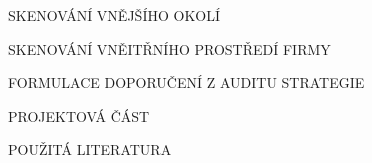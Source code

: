 \begin{lefttextpipe}
	{\Large \MakeUppercase{} SKENOVÁNÍ VNĚJŠÍHO OKOLÍ}
\end{lefttextpipe}

\begin{lefttextpipe}
	{\Large \MakeUppercase{} SKENOVÁNÍ VNĚITŘNÍHO PROSTŘEDÍ FIRMY}
\end{lefttextpipe}

\begin{lefttextpipe}
	{\Large \MakeUppercase{} FORMULACE DOPORUČENÍ Z AUDITU STRATEGIE}
\end{lefttextpipe}

\begin{lefttextpipe}
	{\Large \MakeUppercase{} PROJEKTOVÁ ČÁST}
\end{lefttextpipe}

\begin{lefttextpipe}
	{\Large POUŽITÁ LITERATURA}
\end{lefttextpipe}